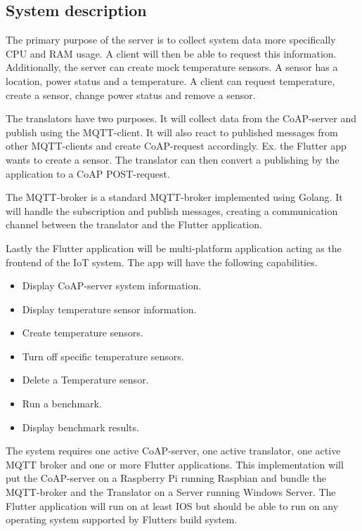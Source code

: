 \subsection{System description}
The primary purpose of the server is to collect system data more specifically CPU and RAM usage. A client will then be able to request this information. Additionally, the server can create mock temperature sensors. A sensor has a location, power status and a temperature. A client can request temperature, create a sensor, change power status and remove a sensor. 

The translators have two purposes. It will collect data from the CoAP-server and publish using the MQTT-client. It will also react to published messages from other MQTT-clients and create CoAP-request accordingly. Ex. the Flutter app wants to create a sensor. The translator can then convert a publishing by the application to a CoAP POST-request.

The MQTT-broker is a standard MQTT-broker implemented using Golang. It will handle the subscription and publish messages, creating a communication channel between the translator and the Flutter application.

Lastly the Flutter application will be multi-platform application acting as the frontend of the IoT system. The app will have the following capabilities. 
\begin{itemize}
    \item Display CoAP-server system information.
    \item Display temperature sensor information.
    \item Create temperature sensors.
    \item Turn off specific temperature sensors.
    \item Delete a Temperature sensor.
    \item Run a benchmark.
    \item Display benchmark results.
\end{itemize}

The system requires one active CoAP-server, one active translator, one active MQTT broker and one or more Flutter applications. This implementation will put the CoAP-server on a Raspberry Pi running Raspbian and bundle the MQTT-broker and the Translator on a Server running Windows Server. The Flutter application will run on at least IOS but should be able to run on any operating system supported by Flutters build system.


